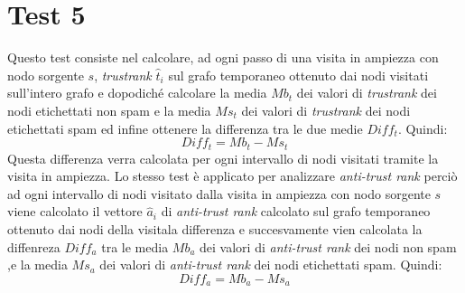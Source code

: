 
\section{Test 5}
Questo test consiste nel calcolare, ad ogni passo di una visita in ampiezza  con nodo sorgente \(s\), \textit{trustrank} \(\hat{t}_i\) sul grafo temporaneo ottenuto dai nodi visitati sull'intero grafo e dopodiché calcolare la media \(Mb_t\) dei valori di \textit{trustrank} dei nodi etichettati non spam e la media \(Ms_t\) dei valori di \textit{trustrank} dei nodi etichettati spam ed infine ottenere la differenza tra le due medie \(Diff_t\). Quindi:
\begin{equation}
 Diff_t = Mb_t-Ms_t
\end{equation}
Questa differenza verra calcolata per ogni intervallo di nodi visitati tramite la visita in ampiezza. Lo stesso test è applicato per analizzare \textit{anti-trust rank} perciò ad ogni intervallo di nodi visitato  dalla visita in ampiezza con nodo sorgente \(s\) viene calcolato il vettore \(\hat{a}_i\)  di \textit{anti-trust rank}  calcolato sul grafo temporaneo ottenuto dai nodi della visitala differenza e succesvamente vien calcolata la diffenreza \(Diff_a\) tra le media \(Mb_a\) dei valori di \textit{anti-trust rank} dei nodi non spam ,e la media \(Ms_a\) dei valori di \textit{anti-trust rank} dei nodi etichettati spam. Quindi:
\begin{equation}
 Diff_a=Mb_a-Ms_a
\end{equation}

